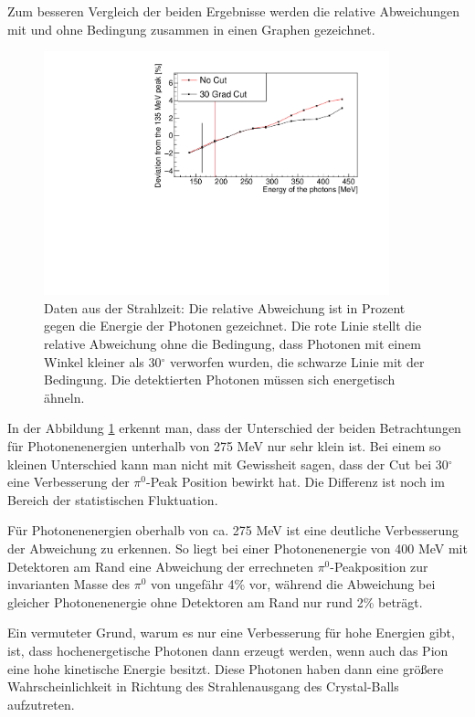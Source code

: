 \documentclass[a4paper,11pt,oneside,final,german,openbib,pdftex]{scrbook}
\begin{document}
{Zum besseren Vergleich der beiden Ergebnisse werden die relative Abweichungen mit und ohne Bedingung zusammen in einen Graphen gezeichnet.
\begin{figure}[h!]
	\begin{center}
		\includegraphics[width=100mm]{20172804StrahlzeitDeviation}
		\caption[Strahlzeit: Vernachl\"assigung der Detektoren am Rand; Abweichung]{Daten aus der Strahlzeit: Die relative Abweichung ist in Prozent gegen die Energie der Photonen gezeichnet. Die rote Linie stellt die relative Abweichung ohne die Bedingung, dass Photonen mit einem Winkel kleiner als 30$^{\circ}$ verworfen wurden, die schwarze Linie mit der Bedingung. Die detektierten Photonen m\"ussen sich energetisch \"ahneln.}
		\label{fig:Vernachlaessigung-Detektoren-am-Rand}
	\end{center}
\end{figure}

 

In der Abbildung \ref{fig:Vernachlaessigung-Detektoren-am-Rand} erkennt man, dass der Unterschied der beiden Betrachtungen f\"ur Photonenenergien unterhalb von 275 MeV nur sehr klein ist. Bei einem so kleinen Unterschied kann man nicht mit Gewissheit sagen, dass der Cut bei 30$^{\circ}$ eine Verbesserung der $\pi^0$-Peak Position bewirkt hat. Die Differenz ist noch im Bereich der statistischen Fluktuation. 

F\"ur Photonenenergien oberhalb von ca. 275 MeV ist eine deutliche Verbesserung der Abweichung zu erkennen. So liegt bei einer Photonenenergie von 400 MeV mit Detektoren am Rand eine Abweichung der errechneten $\pi^0$-Peakposition zur invarianten Masse des $\pi^0$ von ungefähr 4\% vor, w\"ahrend die Abweichung bei gleicher Photonenenergie ohne Detektoren am Rand nur rund 2\% betr\"agt.

Ein vermuteter Grund, warum es nur eine Verbesserung für hohe Energien gibt, ist, dass hochenergetische Photonen dann erzeugt werden, wenn auch das Pion eine hohe kinetische Energie besitzt. Diese Photonen haben dann eine gr\"o{\ss}ere Wahrscheinlichkeit in Richtung des Strahlenausgang des Crystal-Balls aufzutreten.

}
\end{document}
